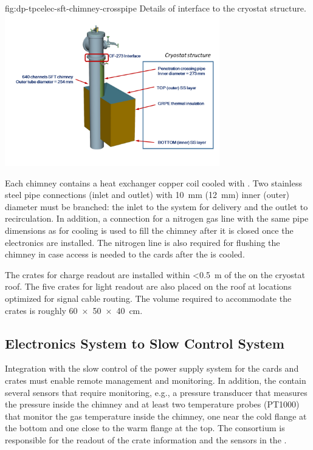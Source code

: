 \begin{dunefigure}{fig:dp-tpcelec-sft-chimney-crosspipe}
{Details of  interface to the cryostat structure.}
\includegraphics[width=0.7\textwidth]{graphics/dp-tpcelec-sft-chimney-crosspipe}
\end{dunefigure}

Each chimney contains a heat exchanger copper coil cooled with . Two stainless steel pipe connections (inlet and outlet) with \SI{10}{\mm} (\SI{12}{\mm}) inner (outer) diameter must be branched: the inlet to the system for  delivery and the outlet to recirculation. In addition, a connection for a nitrogen gas line with the same pipe dimensions as for  cooling is used to fill the chimney after it is closed once the  electronics are installed. The nitrogen line is also required for flushing the chimney in case access is needed to the  cards after the  is cooled. %

The  crates for charge readout are installed within \SI{<0.5}{\meter} of the  on %
the cryostat roof. The five  crates for light readout are also placed on the roof %
at %
locations optimized for %
 signal cable routing. The volume required  to accommodate the crates is roughly \SI[product-units=power]{60x50x40}{\cm}. 

\subsection{Electronics System to Slow Control System}
\label{ssec:dp-tpcelec-intfc-sc}

Integration with the slow control of the  power supply system for the  cards and  crates %
must enable remote management and monitoring. In addition, the  contain several sensors that require monitoring, e.g.,  %
a pressure transducer that measures the pressure inside the chimney and at least two temperature probes (PT1000) that monitor the gas temperature inside the chimney, one near the cold flange at the bottom and one close to the warm flange at the top. The  consortium is responsible for the readout of the  crate information and the sensors in the . %
